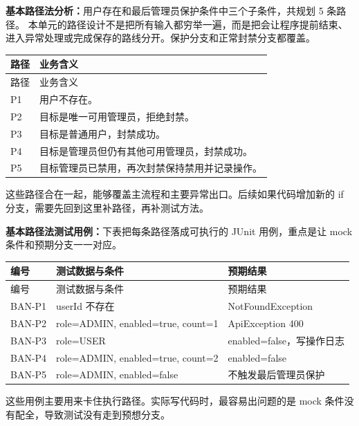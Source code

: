 \documentclass[bwprint]{report}
\begin{document}
\textbf{基本路径法分析：}用户存在和最后管理员保护条件中三个子条件，共规划 5 条路径。 本单元的路径设计不是把所有输入都穷举一遍，而是把会让程序提前结束、进入异常处理或完成保存的路线分开。保护分支和正常封禁分支都覆盖。

{
\setlength{\tabcolsep}{3pt}
\begin{longtable}{P{1.2cm}P{12.0cm}}
\toprule
路径 & 业务含义\\
\midrule
\endfirsthead
\toprule
路径 & 业务含义\\
\midrule
\endhead
P1 & 用户不存在。 \\
P2 & 目标是唯一可用管理员，拒绝封禁。 \\
P3 & 目标是普通用户，封禁成功。 \\
P4 & 目标是管理员但仍有其他可用管理员，封禁成功。 \\
P5 & 目标管理员已禁用，再次封禁保持禁用并记录操作。 \\
\bottomrule
\end{longtable}
}
这些路径合在一起，能够覆盖主流程和主要异常出口。后续如果代码增加新的 if 分支，需要先回到这里补路径，再补测试方法。

\textbf{基本路径法测试用例：}下表把每条路径落成可执行的 JUnit 用例，重点是让 mock 条件和预期分支一一对应。
{
\setlength{\tabcolsep}{3pt}
\begin{longtable}{P{2.4cm}P{4.9cm}P{5.8cm}}
\toprule
编号 & 测试数据与条件 & 预期结果\\
\midrule
\endfirsthead
\toprule
编号 & 测试数据与条件 & 预期结果\\
\midrule
\endhead
BAN-\hspace{0pt}P1 & user\hspace{0pt}Id 不存在 & Not\hspace{0pt}Found\hspace{0pt}Exception \\
BAN-\hspace{0pt}P2 & role=\hspace{0pt}ADMIN, enabled=\hspace{0pt}true, count=\hspace{0pt}1 & Api\hspace{0pt}Exception 400 \\
BAN-\hspace{0pt}P3 & role=\hspace{0pt}USER & enabled=\hspace{0pt}false，写操作日志 \\
BAN-\hspace{0pt}P4 & role=\hspace{0pt}ADMIN, enabled=\hspace{0pt}true, count=\hspace{0pt}2 & enabled=\hspace{0pt}false \\
BAN-\hspace{0pt}P5 & role=\hspace{0pt}ADMIN, enabled=\hspace{0pt}false & 不触发最后管理员保护 \\
\bottomrule
\end{longtable}
}
这些用例主要用来卡住执行路径。实际写代码时，最容易出问题的是 mock 条件没有配全，导致测试没有走到预想分支。
\end{document}
